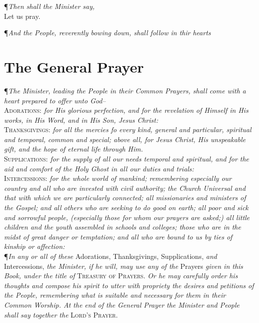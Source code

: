 {\centering \P \textit{Then shall the Minister say,} \\ Let us pray. \par}
\vspace{1ex}
\noindent\P \textit{And the People, reverently bowing down, shall follow in thir hearts}

\section*{The General Prayer}

\P \textit{The Minister, leading the People in their Common Prayers, shall come with a heart prepared to offer unto God--} \\

\noindent \textsc{Adorations:} \textit{for His glorious perfection, and for the revelation of Himself in His works, in His Word, and in His Son, Jesus Christ:} \\

\noindent \textsc{Thanksgivings:} \textit{for all the mercies fo every kind, general and particular, spiritual and temporal, common and special; above all, for Jesus Christ, His unspeakable gift, and the hope of eternal life through Him.} \\

\noindent \textsc{Supplications:} \textit{for the supply of all our needs temporal and spiritual, and for the aid and comfort of the Holy Ghost in all our duties and trials:} \\

\noindent \textsc{Intercessions:} \textit{for the whole world of mankind; remembering especially our country and all who are invested with civil authority; the Church Universal and that with which we are particularly connected; all missionaries and ministers of the Gospel; and all others who are seeking to do good on earth; all poor and sick and sorrowful people, (especially those for whom our prayers are asked;) all little children and the youth assembled in schools and colleges; those who are in the midst of great danger or temptation; and all who are bound to us by ties of kinship or affection:} \\

\noindent \P \textit{In any or all of these} Adorations, Thanksgivings, Supplications, \textit{and} Intercessions, \textit{the Minister, if he will, may use any of the} Prayers \textit{given in this Book, under the title of} \textsc{Treasury of Prayers.}
\textit{Or he may carefully order his thoughts and compose his spirit to utter with propriety the desires and petitions of the People, remembering what is suitable and necessary for them in their Common Worship.
At the end of the General Prayer the Minister and People shall say together the} \textsc{Lord's Prayer.}

